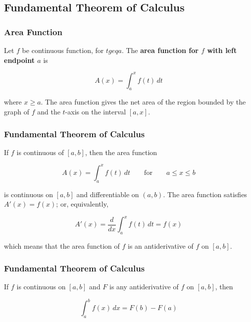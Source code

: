 %
%
%

\subsection{Fundamental Theorem of Calculus}
\subsubsection{Area Function}
Let $f$ be continuous function, for $t geq a$. The \textbf{area function for $f$ with left endpoint $a$} is

\begin{equation}
    A(x) = \int _a ^x f(t)\, dt 
\end{equation}

where $x \geq a$. The area function gives the net area of the region bounded by the graph of $f$ and the $t$-axis on the interval $[a, x]$.

\subsubsection{Fundamental Theorem of Calculus}
If $f$ is continuous of $[a, b]$, then the area function

\begin{equation}
    A(x) = \int _a ^x f(t)\, dt \qquad\text{for}\qquad a \leq x \leq b
\end{equation}

is continuous on $[a, b]$ and differentiable on $(a, b)$. The area function satisfies $A'(x) = f(x)$; or, equivalently,

\begin{equation}
    A'(x) = \frac{d}{dx}\int _a ^x f(t)\, dt = f(x)
\end{equation}

which means that the area function of $f$ is an antiderivative of $f$ on $[a, b]$.

\subsubsection{Fundamental Theorem of Calculus}
If $f$ is continuous on $[a, b]$ and $F$ is any antiderivative of $f$ on $[a, b]$, then

\begin{equation}
    \int _a ^b f(x)\, dx = F(b) - F(a)
\end{equation}
